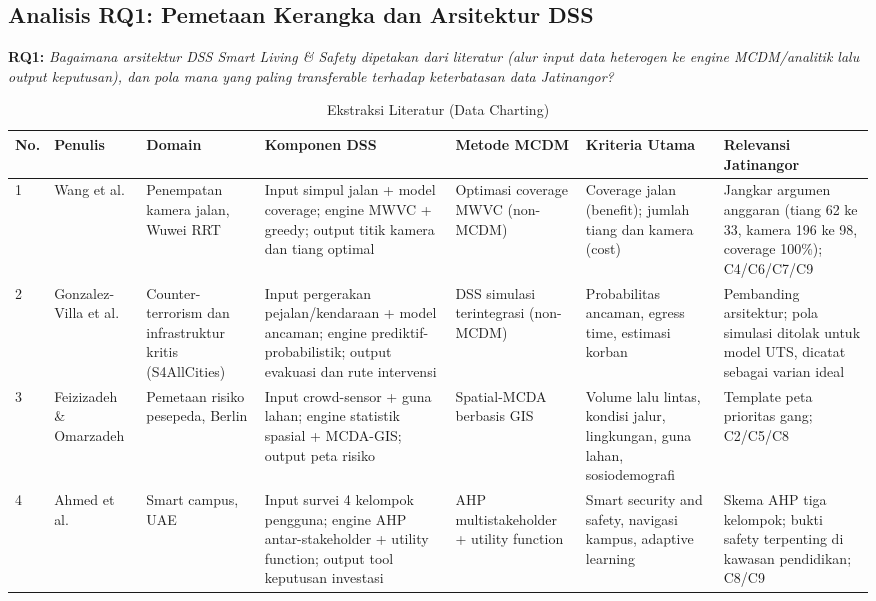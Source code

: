\documentclass[conference]{IEEEtran}
\begin{document}
\subsection{Analisis RQ1: Pemetaan Kerangka dan Arsitektur DSS}

\noindent\textbf{RQ1:} \textit{Bagaimana arsitektur DSS Smart Living \& Safety dipetakan dari literatur (alur input data heterogen ke engine MCDM/analitik lalu output keputusan), dan pola mana yang paling transferable terhadap keterbatasan data Jatinangor?}

\begin{table}[!t]
\caption{Ekstraksi Literatur (Data Charting)}
\label{tab:charting}
\setlength{\tabcolsep}{3pt}
\centering
\small
\begin{tabular}{p{0.5cm}p{1.6cm}p{1.9cm}p{3.6cm}p{2.2cm}p{2.2cm}p{3.4cm}}
\toprule
\textbf{No.} & \textbf{Penulis} & \textbf{Domain} & \textbf{Komponen DSS} & \textbf{Metode MCDM} & \textbf{Kriteria Utama} & \textbf{Relevansi Jatinangor} \\
\midrule
1 & Wang et al. \cite{wang2025} & Penempatan kamera jalan, Wuwei RRT & Input simpul jalan + model coverage; engine MWVC + greedy; output titik kamera dan tiang optimal & Optimasi coverage MWVC (non-MCDM) & Coverage jalan (benefit); jumlah tiang dan kamera (cost) & Jangkar argumen anggaran (tiang 62 ke 33, kamera 196 ke 98, coverage 100\%); C4/C6/C7/C9 \\
2 & Gonzalez-Villa et al. \cite{gonzalez2024} & Counter-terrorism dan infrastruktur kritis (S4AllCities) & Input pergerakan pejalan/kendaraan + model ancaman; engine prediktif-probabilistik; output evakuasi dan rute intervensi & DSS simulasi terintegrasi (non-MCDM) & Probabilitas ancaman, egress time, estimasi korban & Pembanding arsitektur; pola simulasi ditolak untuk model UTS, dicatat sebagai varian ideal \\
3 & Feizizadeh \& Omarzadeh \cite{feizizadeh2025} & Pemetaan risiko pesepeda, Berlin & Input crowd-sensor + guna lahan; engine statistik spasial + MCDA-GIS; output peta risiko & Spatial-MCDA berbasis GIS & Volume lalu lintas, kondisi jalur, lingkungan, guna lahan, sosiodemografi & Template peta prioritas gang; C2/C5/C8 \\
4 & Ahmed et al. \cite{ahmed2022} & Smart campus, UAE & Input survei 4 kelompok pengguna; engine AHP antar-stakeholder + utility function; output tool keputusan investasi & AHP multistakeholder + utility function & Smart security and safety, navigasi kampus, adaptive learning & Skema AHP tiga kelompok; bukti safety terpenting di kawasan pendidikan; C8/C9 \\

\end{tabular}
\end{table}
\end{document}
